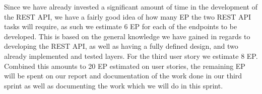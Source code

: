 \bigskip
Since we have already invested a significant amount of time in the development of the REST API, we have a fairly good idea of how many EP the two REST API tasks will require, as such we estimate 6 EP for each of the endpoints to be developed.
This is based on the general knowledge we have gained in regards to developing the REST API, as well as having a fully defined design, and two already implemented and tested layers.%
For the third user story we estimate 8 EP.
Combined this amounts to 20 EP estimated on user stories, the remaining EP will be spent on our report and documentation of the work done in our third sprint as well as documenting the work which we will do in this sprint.
